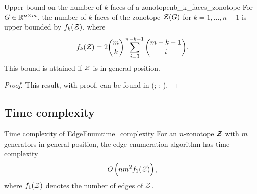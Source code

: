 \begin{lemmabox}{Upper bound on the number of $k$-faces of a zonotope}{nb_k_faces_zonotope}
  For $G\in\mathbb{R}^{n\times m}$, the number of $k$-faces of the zonotope $\mathcal{Z}(G)$ for $k=1,\dots, n-1$ is upper bounded by $f_k(\mathcal{Z})$, where
  \[f_k(\mathcal{Z}) = 2\binom{m}{k} \sum_{i = 0}^{n-k-1} \binom{m-k-1}{i}.\]
  This bound is attained if $\mathcal{Z}$ is in general position.
\end{lemmabox}
\begin{proof}
  This result, with proof, can be found in (\cite{fukudaZonotopeConstructionMinkowski2004a}; \cite{donohoCountingFacesRandomlyProjected2010}; \cite{grunbaumConvexPolytopes2013}).
\end{proof}

\subsection{Time complexity}
\begin{theorembox}{Time complexity of EdgeEnum}{time_complexity}
  For an $n$-zonotope $\mathcal{Z}$ with $m$ generators in general position, the edge enumeration algorithm has time complexity
  \[O\left( nm^2f_1(\mathcal{Z})\right),\]
  where $f_1(\mathcal{Z})$ denotes the number of edges of $\mathcal{Z}$.
\end{theorembox}
